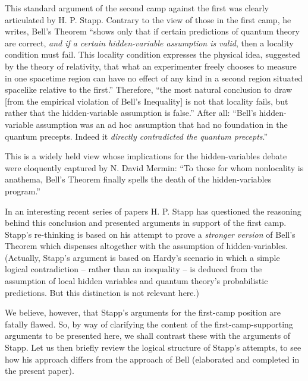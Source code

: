\documentclass[aps,prc,onecolumn,12pt]{revtex4-2}
\begin{document}
This standard argument of the second camp against the first
was clearly articulated by H. P. Stapp.  Contrary to the view of
those in the first camp, he writes, Bell's Theorem ``shows only that if
certain predictions of quantum theory are correct, \emph{and if a certain
hidden-variable assumption is valid}, then a locality condition
must fail.  This locality condition expresses the physical idea,
suggested by the theory of relativity, that what an experimenter
freely chooses to measure in one spacetime region can have no effect
of any kind in a second region situated spacelike relative to the
first.''  Therefore,
``the most natural conclusion to draw [from the empirical violation of
Bell's Inequality] is not that locality fails, but
rather that the hidden-variable assumption is false.''  After all:
``Bell's
hidden-variable assumption was an ad hoc assumption that had no
foundation in the quantum precepts.  Indeed it \emph{directly
contradicted the quantum precepts}.''  \cite{stapp:btwhv}

This is a widely held view whose implications for the hidden-variables
debate were eloquently captured by N. David Mermin:  ``To
those for whom nonlocality is anathema, Bell's Theorem finally spells
the death of the hidden-variables program.'' \cite{merminquote}

In an interesting recent series of papers
H. P. Stapp has questioned the reasoning behind this
conclusion and presented arguments in support of the first camp.
\cite{stapp:btwhv,stapp1,stapp2}
Stapp's re-thinking is based on his attempt to
prove a \emph{stronger version} of Bell's Theorem which dispenses
altogether with the assumption of hidden-variables.
(Actually, Stapp's argument is based on Hardy's scenario \cite{hardy}
in which a simple logical contradiction -- rather than an inequality
-- is deduced from the assumption of
local hidden variables and quantum theory's probabilistic
predictions.  But this distinction is not relevant here.)

We believe, however, that Stapp's arguments for the first-camp
position are fatally flawed.  So, by way of clarifying the content of
the first-camp-supporting arguments to be presented here, we shall
contrast these with the arguments of Stapp.  Let us then briefly
review the logical structure of Stapp's attempts, to see how his
approach differs from the approach of Bell (elaborated and completed
in the present paper).
\end{document}
